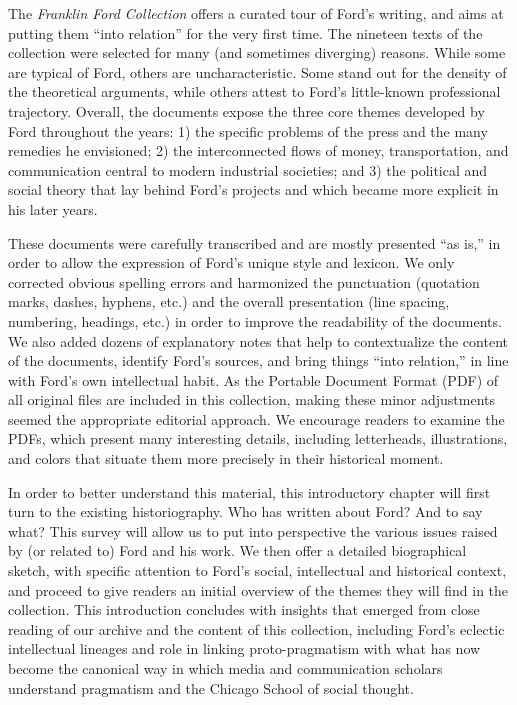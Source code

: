 \documentclass[twoside,symmetric,nobib,justified]{tufte-book}
\begin{document}
The \emph{Franklin Ford Collection} offers a curated tour of Ford's
writing, and aims at putting them ``into relation'' for the very first
time. The nineteen texts of the collection were selected for many (and
sometimes diverging) reasons. While some are typical of Ford, others are
uncharacteristic. Some stand out for the density of the theoretical
arguments, while others attest to Ford's little-known professional
trajectory. Overall, the documents expose the three core themes
developed by Ford throughout the years: 1) the specific problems of the
press and the many remedies he envisioned; 2) the interconnected flows
of money, transportation, and communication central to modern industrial
societies; and 3) the political and social theory that lay behind Ford's
projects and which became more explicit in his later years.

These documents were carefully transcribed and are mostly presented ``as
is,'' in order to allow the expression of Ford's unique style and
lexicon. We only corrected obvious spelling errors and harmonized the
punctuation (quotation marks, dashes, hyphens, etc.) and the overall
presentation (line spacing, numbering, headings, etc.) in order to
improve the readability of the documents. We also added dozens of
explanatory notes that help to contextualize the content of the
documents, identify Ford's sources, and bring things ``into relation,''
in line with Ford's own intellectual habit. As the Portable Document
Format (PDF) of all original files are included in this collection,
making these minor adjustments seemed the appropriate editorial
approach. We encourage readers to examine the PDFs, which present many
interesting details, including letterheads, illustrations, and colors
that situate them more precisely in their historical moment.

In order to better understand this material, this introductory chapter
will first turn to the existing historiography. Who has written about
Ford? And to say what? This survey will allow us to put into perspective
the various issues raised by (or related to) Ford and his work. We then
offer a detailed biographical sketch, with specific attention to Ford's
social, intellectual and historical context, and proceed to give readers
an initial overview of the themes they will find in the collection. This
introduction concludes with insights that emerged from close reading of
our archive and the content of this collection, including Ford's
eclectic intellectual lineages and role in linking proto-pragmatism with
what has now become the canonical way in which media and communication
scholars understand pragmatism and the Chicago School of social thought.
\end{document}
